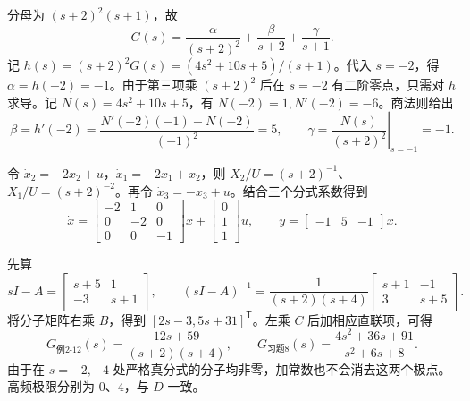 

\sol 分母为 $(s+2)^2(s+1)$，故
\[
G(s)=\frac{\alpha}{(s+2)^2}+\frac{\beta}{s+2}+\frac{\gamma}{s+1}.
\]
记 $h(s)=(s+2)^2G(s)=(4s^2+10s+5)/(s+1)$。代入 $s=-2$，得 $\alpha=h(-2)=-1$。由于第三项乘 $(s+2)^2$ 后在 $s=-2$ 有二阶零点，只需对 $h$ 求导。记 $N(s)=4s^2+10s+5$，有 $N(-2)=1,N'(-2)=-6$。商法则给出
\[
\beta=h'(-2)=\frac{N'(-2)(-1)-N(-2)}{(-1)^2}=5,\qquad
\gamma=\left.\frac{N(s)}{(s+2)^2}\right|_{s=-1}=-1.
\]

令 $\dot x_2=-2x_2+u$，$\dot x_1=-2x_1+x_2$，则 $X_2/U=(s+2)^{-1}$、$X_1/U=(s+2)^{-2}$。再令 $\dot x_3=-x_3+u$。结合三个分式系数得到
\[
\dot x=\begin{bmatrix}-2&1&0\\0&-2&0\\0&0&-1\end{bmatrix}x+
\begin{bmatrix}0\\1\\1\end{bmatrix}u,\qquad
y=\begin{bmatrix}-1&5&-1\end{bmatrix}x .
\]



\sol 先算
\[
sI-A=\begin{bmatrix}s+5&1\\-3&s+1\end{bmatrix},\qquad
(sI-A)^{-1}=\frac{1}{(s+2)(s+4)}
\begin{bmatrix}s+1&-1\\3&s+5\end{bmatrix}.
\]
将分子矩阵右乘 $B$，得到 $[2s-3,5s+31]^{\mathsf T}$。左乘 $C$ 后加相应直联项，可得
\[
G_{\text{例2-12}}(s)=\frac{12s+59}{(s+2)(s+4)},\qquad
G_{\text{习题8}}(s)=\frac{4s^2+36s+91}{s^2+6s+8}.
\]
由于在 $s=-2,-4$ 处严格真分式的分子均非零，加常数也不会消去这两个极点。高频极限分别为 $0$、$4$，与 $D$ 一致。

